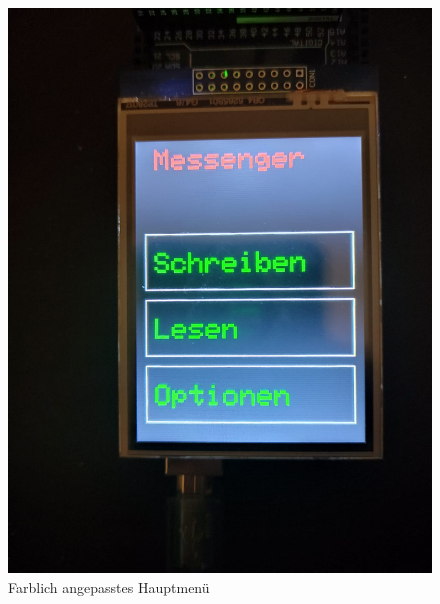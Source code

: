 \documentclass[a4paper, 11pt]{scrartcl}
\begin{document}
\begin{small}
\begin{figure}[H]
    \begin{center}
        \includegraphics[scale=0.13]{Bilder/MainMenu_green_text.jpeg}
        \caption{Farblich angepasstes Hauptmenü}\label{pic:menu_green}
    \end{center}
\end{figure}


\end{small}
\end{document}
